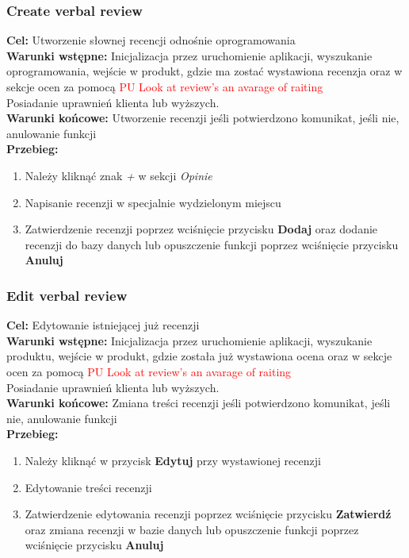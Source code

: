 \documentclass[12pt,a4paper]{article}
\begin{document}
\subsubsection{Create verbal review}
\textbf{Cel: } Utworzenie słownej recencji odnośnie oprogramowania \\
\textbf{Warunki wstępne:} Inicjalizacja przez uruchomienie aplikacji, wyszukanie oprogramowania, wejście w produkt, gdzie ma zostać wystawiona recenzja oraz w sekcje ocen za pomocą \textcolor{red}{PU Look at review's an avarage of raiting} \\ Posiadanie uprawnień klienta lub wyższych.\\
\textbf{Warunki końcowe:} Utworzenie recenzji jeśli potwierdzono komunikat, jeśli nie, anulowanie funkcji \\
\textbf{Przebieg:}
\begin{enumerate}
    \item Należy kliknąć znak \textit{+} w sekcji \textit{Opinie}
    \item Napisanie recenzji w specjalnie wydzielonym miejscu
    \item Zatwierdzenie recenzji poprzez wciśnięcie przycisku \textbf{Dodaj} oraz dodanie recenzji do bazy danych lub opuszczenie funkcji poprzez wciśnięcie przycisku \textbf{Anuluj}
\end{enumerate}

\subsubsection{Edit verbal review}
\textbf{Cel: } Edytowanie istniejącej już recenzji \\
\textbf{Warunki wstępne:} Inicjalizacja przez uruchomienie aplikacji, wyszukanie produktu, wejście w produkt, gdzie została już wystawiona ocena oraz w sekcje ocen za pomocą \textcolor{red}{PU Look at review's an avarage of raiting}\\ Posiadanie uprawnień klienta lub wyższych.\\ 
\textbf{Warunki końcowe:} Zmiana treści recenzji jeśli potwierdzono komunikat, jeśli nie, anulowanie funkcji \\
\textbf{Przebieg:}
\begin{enumerate}
    \item Należy kliknąć w przycisk \textbf{Edytuj} przy wystawionej recenzji
    \item Edytowanie treści recenzji
    \item Zatwierdzenie edytowania recenzji poprzez wciśnięcie przycisku \textbf{Zatwierdź} oraz zmiana recenzji w bazie danych lub opuszczenie funkcji poprzez wciśnięcie przycisku \textbf{Anuluj}
\end{enumerate}
\end{document}
